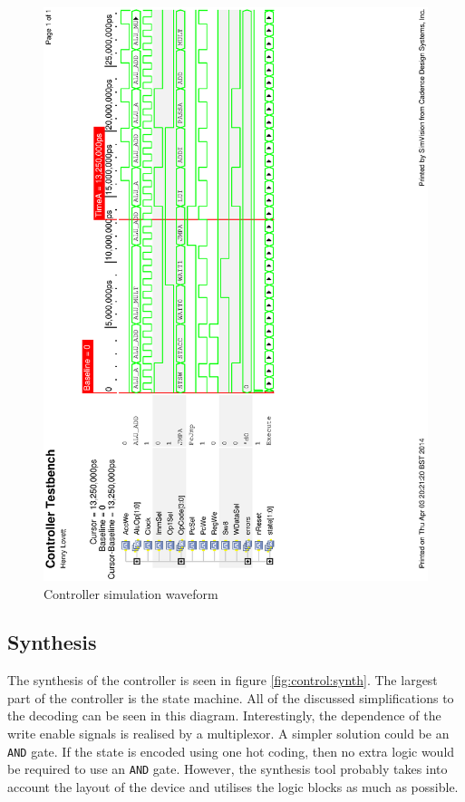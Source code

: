 \begin{figure}
\includegraphics[height=\textheight-1cm]{Figures/controllersim.eps}
\caption{Controller simulation waveform}
\label{fig:controllersim}
\end{figure}


\subsection{Synthesis}


The synthesis of the controller is seen in figure \ref{fig:control:synth}.
The largest part of the controller is the state machine. 
All of the discussed simplifications to the decoding can be seen in this diagram.
Interestingly, the dependence of the write enable signals is realised by a multiplexor.
A simpler solution could be an \texttt{AND} gate. 
If the state is encoded using one hot coding, then no extra logic would be required to use an \texttt{AND} gate.
However, the synthesis tool probably takes into account the layout of the device and utilises the logic blocks as much as possible.


